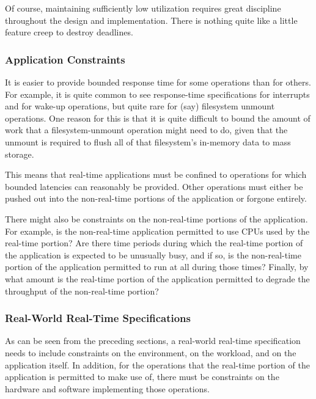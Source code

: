 Of course, maintaining sufficiently low utilization requires great
discipline throughout the design and implementation.
There is nothing quite like a little feature creep to destroy deadlines.

\subsubsection{Application Constraints}
\label{sec:rt:Application Constraints}

It is easier to provide bounded response time for some operations than
for others.
For example, it is quite common to see response-time specifications for
interrupts and for wake-up operations, but quite rare for (say)
filesystem unmount operations.
One reason for this is that it is quite difficult to bound the amount
of work that a filesystem-unmount operation might need to do, given that
the unmount is required to flush all of that filesystem's in-memory
data to mass storage.

This means that real-time applications must be confined to operations
for which bounded latencies can reasonably be provided.
Other operations must either be pushed out into the non-real-time portions
of the application or forgone entirely.

There might also be constraints on the non-real-time portions of the
application.
For example, is the non-real-time application permitted to use CPUs used
by the real-time portion?
Are there time periods during which the real-time portion of the application
is expected to be unusually busy, and if so, is the non-real-time portion
of the application permitted to run at all during those times?
Finally, by what amount is the real-time portion of the application permitted
to degrade the throughput of the non-real-time portion?

\subsubsection{Real-World Real-Time Specifications}
\label{sec:rt:Real-World Real-Time Specifications}

As can be seen from the preceding sections, a real-world real-time
specification needs to include constraints on the environment,
on the workload, and on the application itself.
In addition, for the operations that the real-time portion of the
application is permitted to make use of, there must be constraints
on the hardware and software implementing those operations.

